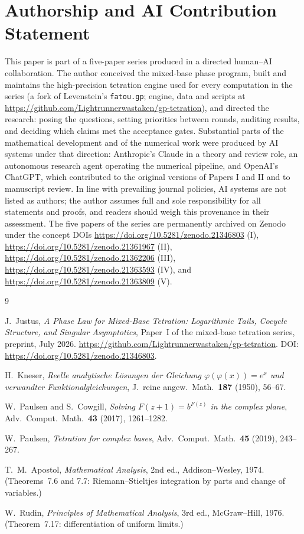 \documentclass[11pt]{article}
\theoremstyle{definition}
\theoremstyle{remark}
\begin{document}
\section*{Authorship and AI Contribution Statement}
This paper is part of a five-paper series produced in a directed human--AI
collaboration. The author conceived the mixed-base phase program, built and
maintains the high-precision tetration engine used for every computation in
the series (a fork of Levenstein's \texttt{fatou.gp}; engine, data and
scripts at \url{https://github.com/Lightrunnerwastaken/gp-tetration}), and directed the research: posing the questions,
setting priorities between rounds, auditing results, and deciding which
claims met the acceptance gates. Substantial parts of the mathematical
development and of the numerical work were produced by AI systems under
that direction: Anthropic's Claude in a theory and review role, an
autonomous research agent operating the numerical pipeline, and OpenAI's
ChatGPT, which contributed to the original versions of Papers I and II and
to manuscript review. In line with prevailing journal policies, AI systems
are not listed as authors; the author assumes full and sole responsibility
for all statements and proofs, and readers should weigh this provenance in
their assessment. The five papers of the series are permanently archived on Zenodo under the concept DOIs \url{https://doi.org/10.5281/zenodo.21346803} (I), \url{https://doi.org/10.5281/zenodo.21361967} (II), \url{https://doi.org/10.5281/zenodo.21362206} (III), \url{https://doi.org/10.5281/zenodo.21363593} (IV), and \url{https://doi.org/10.5281/zenodo.21363809} (V).

\begin{thebibliography}{9}

 J.~Justus, \emph{A Phase Law for Mixed-Base Tetration: Logarithmic Tails, Cocycle Structure, and Singular Asymptotics}, Paper~I of the mixed-base tetration series, preprint, July 2026. \url{https://github.com/Lightrunnerwastaken/gp-tetration}. DOI: \url{https://doi.org/10.5281/zenodo.21346803}.

 H.~Kneser,
\emph{Reelle analytische L\"osungen der Gleichung
$\varphi(\varphi(x))=e^{x}$ und verwandter Funktionalgleichungen},
J.~reine angew.~Math.\ \textbf{187} (1950), 56--67.

 W.~Paulsen and S.~Cowgill,
\emph{Solving $F(z+1)=b^{F(z)}$ in the complex plane},
Adv.~Comput.~Math.\ \textbf{43} (2017), 1261--1282.

 W.~Paulsen,
\emph{Tetration for complex bases},
Adv.~Comput.~Math.\ \textbf{45} (2019), 243--267.

 T.~M.~Apostol,
\emph{Mathematical Analysis}, 2nd ed., Addison--Wesley, 1974.
(Theorems~7.6 and 7.7: Riemann--Stieltjes integration by parts and change
of variables.)

 W.~Rudin,
\emph{Principles of Mathematical Analysis}, 3rd ed., McGraw--Hill, 1976.
(Theorem~7.17: differentiation of uniform limits.)

\end{thebibliography}
\end{document}
